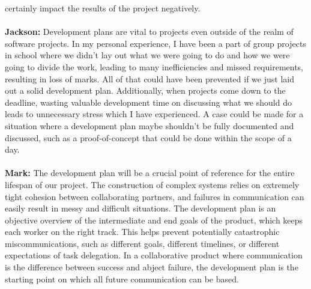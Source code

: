 \documentclass{article}
\begin{document}
\begin{enumerate}
                    certainly impact the results of the project negatively.\\ \\
    \textbf{Jackson:} Development plans are vital to projects even outside of the realm of software projects. In my personal experience, I have been a part of group projects 
                      in school where we didn’t lay out what we were going to do and how we were going to divide the work, leading to many inefficiencies and missed requirements, resulting 
                      in loss of marks. All of that could have been prevented if we just laid out a solid development plan. Additionally, when projects come down to the deadline, wasting 
                      valuable development time on discussing what we should do leads to unnecessary stress which I have experienced. A case could be made for a situation where a development 
                      plan maybe shouldn’t be fully documented and discussed, such as a proof-of-concept that could be done within the scope of a day.\\ \\
    \textbf{Mark:} The development plan will be a crucial point of reference for the entire lifespan of our project. The construction of complex systems relies on extremely tight cohesion between collaborating partners, and failures in communication can easily result in messy and difficult situations.
                   The development plan is an objective overview of the intermediate and end goals of the product, which keeps each worker on the right track. This helps prevent potentially catastrophic miscommunications, such as different goals, different timelines, or different expectations of task delegation. 
                   In a collaborative product where communication is the difference between success and abject failure, the development plan is the starting point on which all future communication can be based.\\ \\


\end{enumerate}
\end{document}

